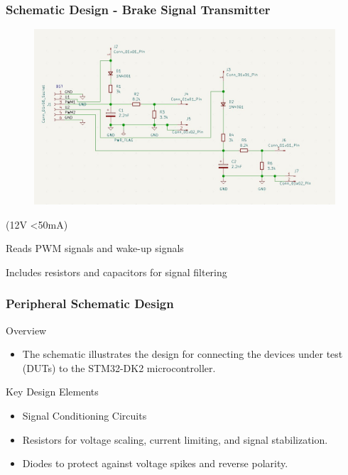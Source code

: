 \documentclass[8pt,compress]{beamer}
\begin{document}
\begin{frame}
  \frametitle{Schematic Design - Brake Signal Transmitter  }
  \begin{minipage}{0.6\textwidth}
    \begin{figure}
      \includegraphics[width=\textwidth]{assets/electronic/bst_schem.jpg}
    \end{figure}
  \end{minipage}
  \hfill
  \begin{minipage}{0.375\textwidth}
    \begin{itemize}
      \begin{block}{(12V <50mA)}
        \item Reads PWM signals and wake-up signals
        \item Includes resistors and capacitors for signal filtering
      \end{block}
    \end{itemize}
  \end{minipage}
\end{frame}

\begin{frame}
  \frametitle{Peripheral Schematic Design}
  \begin{block}{Overview}
    \begin{itemize}
      \item The schematic illustrates the design for connecting the devices under test (DUTs) to the STM32-DK2 microcontroller.
    \end{itemize}
  \end{block}
  \begin{block}{Key Design Elements}
    \begin{itemize}
      \item Signal Conditioning Circuits
      \item Resistors for voltage scaling, current limiting, and signal stabilization.
      \item Diodes to protect against voltage spikes and reverse polarity.
    \end{itemize}
  \end{block}
\end{frame}
\end{document}
